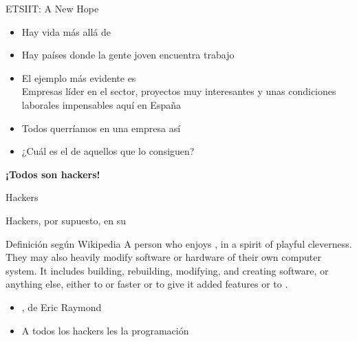 \documentclass[14pt]{beamer}
\newcommand{\WebLink}[2]{
  \href{#1}{\structure{\ding{43}~\color{sail-green}{#2}}}
}
\begin{document}
\begin{frame}{ETSIIT: A New Hope}
  \begin{itemize}
    \item Hay vida más allá de 
    \item Hay países donde la gente joven encuentra trabajo
    \item El ejemplo más evidente es  \\
      {\small Empresas líder en el sector, proyectos muy interesantes
        y unas condiciones laborales impensables aquí en España}
    \item Todos querríamos  en una empresa así
    \item ¿Cuál es el  de aquellos que lo consiguen?
  \end{itemize}
  \begin{center} \Large \bf ¡Todos son hackers!\end{center}
\end{frame}


\begin{frame}{Hackers}
    \begin{center}
      Hackers, por supuesto, en su 
    \end{center}

    \begin{block}{\footnotesize Definición según Wikipedia}
      \centering \footnotesize A person who enjoys , in a spirit of playful
      cleverness. They may also heavily modify software or hardware of
      their own computer system. It includes building, rebuilding,
      modifying, and creating software, or anything else, either to
       or faster or to give it added
      features or to .
    \end{block}

  \begin{itemize}
    \item \WebLink{http://www.catb.org/esr/faqs/hacker-howto.html}
                  {How To Become A Hacker}, de Eric Raymond
    \item A todos los hackers les  la programación
  \end{itemize}
\end{frame}
\end{document}
